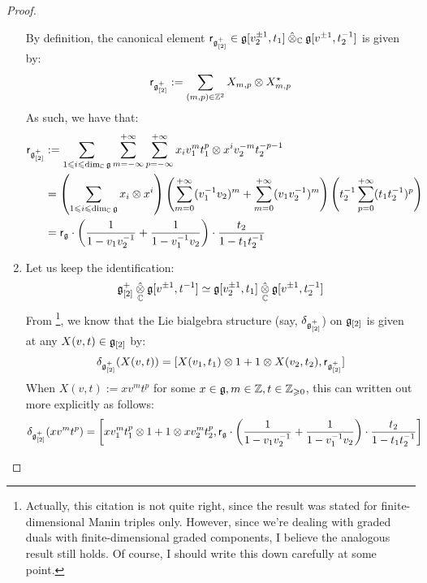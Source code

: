 \begin{proof}
\begin{enumerate}
                        By definition, the canonical element $\sfr_{\g_{[2]}^+} \in \g[v_2^{\pm 1}, t_1] \hattensor_{\bbC} \g[v^{\pm 1}, t_2^{-1}]$ is given by:
                            $$\sfr_{\g_{[2]}^+} := \sum_{(m, p) \in \Z^2} X_{m, p} \tensor X_{m, p}^{\star}$$
                        As such, we have that:
                            $$
                                \begin{aligned}
                                    \sfr_{\g_{[2]}^+} & := \sum_{1 \leq i \leq \dim_{\bbC} \g} \sum_{m = -\infty}^{+\infty} \sum_{p = -\infty}^{+\infty} x_i v_1^m t_1^p \tensor x^i v_2^{-m} t_2^{-p - 1}
                                    \\
                                    & = \left( \sum_{1 \leq i \leq \dim_{\bbC} \g} x_i \tensor x^i \right) \left( \sum_{m = 0}^{+\infty} (v_1^{-1} v_2)^m + \sum_{m = 0}^{+\infty} (v_1 v_2^{-1})^m \right) \left( t_2^{-1} \sum_{p = 0}^{+\infty} (t_1 t_2^{-1})^p \right)
                                    \\
                                    & = \sfr_{\g} \cdot \left( \frac{1}{1 - v_1 v_2^{-1}} + \frac{1}{1 - v_1^{-1} v_2} \right) \cdot \frac{t_2}{1 - t_1 t_2^{-1}}
                                \end{aligned}
                            $$
                        \item Let us keep the identification:
                            $$\g_{[2]}^+ \hattensor_{\bbC} \g[v^{\pm 1}, t^{-1}] \cong \g[v_2^{\pm 1}, t_1] \hattensor_{\bbC} \g[v^{\pm 1}, t_2^{-1}]$$
                        From \cite[pp. 5]{etingof_kazhdan_quantisation_1}\footnote{Actually, this citation is not quite right, since the result was stated for finite-dimensional Manin triples only. However, since we're dealing with graded duals with finite-dimensional graded components, I believe the analogous result still holds. Of course, I should write this down carefully at some point.}, we know that the Lie bialgebra structure (say, $\delta_{\g_{[2]}^+}$) on $\g_{[2]}$ is given at any $X(v, t) \in \g_{[2]}$ by:
                            $$\delta_{\g_{[2]}^+}( X(v, t) ) = [X(v_1, t_1) \tensor 1 + 1 \tensor X(v_2, t_2), \sfr_{\g_{[2]}^+}]$$
                        When $X(v, t) := x v^m t^p$ for some $x \in \g, m \in \Z, t \in \Z_{\geq 0}$, this can written out more explicitly as follows:
                            $$
                                \begin{aligned}
                                    \delta_{\g_{[2]}^+}( x v^m t^p ) & = \left[x v_1^m t_1^p \tensor 1 + 1 \tensor x v_2^m t_2^p, \sfr_{\g} \cdot \left( \frac{1}{1 - v_1 v_2^{-1}} + \frac{1}{1 - v_1^{-1} v_2} \right) \cdot \frac{t_2}{1 - t_1 t_2^{-1}}\right]

\end{aligned}$$
\end{enumerate}
\end{proof}

